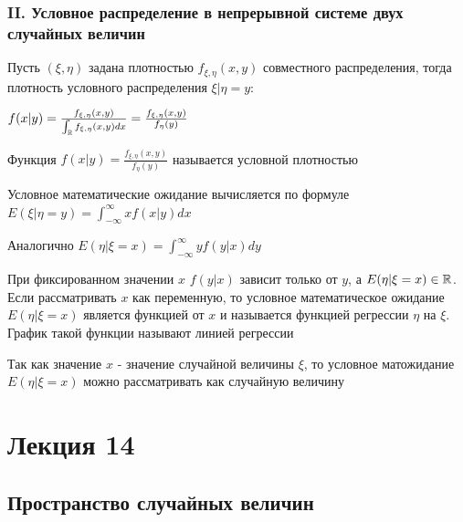 \documentclass[12pt]{article}
\begin{document}
    \subsubsection{II. Условное распределение в непрерывной системе двух случайных величин}

    \hypertarget{conditionaldistributionincontinuoussystem}{}

    Пусть $(\xi, \eta)$ задана плотностью $f_{\xi, \eta}(x, y)$ совместного распределения, тогда плотность 
    условного распределения $\xi | \eta = y$: 

    $f(x | y) = \frac{f_{\xi, \eta}(x, y)}{\int_{\mathbb{R}} f_{\xi, \eta}(x, y)dx} = \frac{f_{\xi, \eta}(x, y)}{f_{\eta}(y)}$

    \Def Функция $f(x | y) = \frac{f_{\xi, \eta}(x, y)}{f_{\eta}(y)}$ называется условной плотностью

    \Def Условное математические ожидание вычисляется по формуле $E(\xi | \eta = y) = \int_{-\infty}^\infty xf(x | y)dx$

    Аналогично $E(\eta | \xi = x) = \int_{-\infty}^\infty yf(y | x)dy$

    \Nota При фиксированном значении $x$ $f(y | x)$ зависит только от $y$, а $E(\eta | \xi = x) \in \mathbb{R}$. 
    Если рассматривать $x$ как переменную, то условное математическое ожидание $E(\eta | \xi = x)$ является
    функцией от $x$ и называется функцией регрессии $\eta$ на $\xi$. График такой функции называют линией регрессии

    \Nota Так как значение $x$ - значение случайной величины $\xi$, то условное матожидание $E(\eta | \xi = x)$ 
    можно рассматривать как случайную величину






\section{Лекция 14}

\subsection{Пространство случайных величин}
\end{document}
